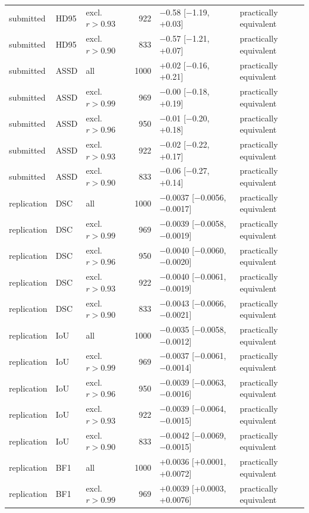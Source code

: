 \begin{tabular}{lllrll}
submitted & HD95 & excl. $r>0.93$ & 922 & $-$0.58 [$-$1.19, +0.03] & practically equivalent \\
submitted & HD95 & excl. $r>0.90$ & 833 & $-$0.57 [$-$1.21, +0.07] & practically equivalent \\
submitted & ASSD & all & 1000 & +0.02 [$-$0.16, +0.21] & practically equivalent \\
submitted & ASSD & excl. $r>0.99$ & 969 & $-$0.00 [$-$0.18, +0.19] & practically equivalent \\
submitted & ASSD & excl. $r>0.96$ & 950 & $-$0.01 [$-$0.20, +0.18] & practically equivalent \\
submitted & ASSD & excl. $r>0.93$ & 922 & $-$0.02 [$-$0.22, +0.17] & practically equivalent \\
submitted & ASSD & excl. $r>0.90$ & 833 & $-$0.06 [$-$0.27, +0.14] & practically equivalent \\
replication & DSC & all & 1000 & $-$0.0037 [$-$0.0056, $-$0.0017] & practically equivalent \\
replication & DSC & excl. $r>0.99$ & 969 & $-$0.0039 [$-$0.0058, $-$0.0019] & practically equivalent \\
replication & DSC & excl. $r>0.96$ & 950 & $-$0.0040 [$-$0.0060, $-$0.0020] & practically equivalent \\
replication & DSC & excl. $r>0.93$ & 922 & $-$0.0040 [$-$0.0061, $-$0.0019] & practically equivalent \\
replication & DSC & excl. $r>0.90$ & 833 & $-$0.0043 [$-$0.0066, $-$0.0021] & practically equivalent \\
replication & IoU & all & 1000 & $-$0.0035 [$-$0.0058, $-$0.0012] & practically equivalent \\
replication & IoU & excl. $r>0.99$ & 969 & $-$0.0037 [$-$0.0061, $-$0.0014] & practically equivalent \\
replication & IoU & excl. $r>0.96$ & 950 & $-$0.0039 [$-$0.0063, $-$0.0016] & practically equivalent \\
replication & IoU & excl. $r>0.93$ & 922 & $-$0.0039 [$-$0.0064, $-$0.0015] & practically equivalent \\
replication & IoU & excl. $r>0.90$ & 833 & $-$0.0042 [$-$0.0069, $-$0.0015] & practically equivalent \\
replication & BF1 & all & 1000 & +0.0036 [+0.0001, +0.0072] & practically equivalent \\
replication & BF1 & excl. $r>0.99$ & 969 & +0.0039 [+0.0003, +0.0076] & practically equivalent \\

\end{tabular}
